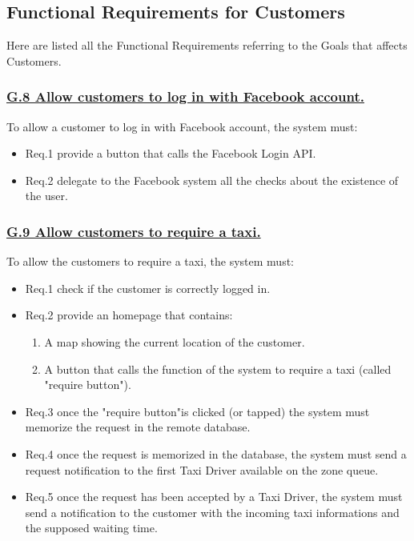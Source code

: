 \documentclass{report}
\begin{document}
		\subsection{Functional Requirements for Customers}
		Here are listed all the Functional Requirements referring to the Goals that affects Customers.

			\subsubsection{\lbrack \hyperref[sec:g8]{G.8 Allow customers to log in with Facebook account.}\rbrack}\label{sec:frs8}
			To allow a customer to log in with Facebook account, the system must:

				\begin{itemize}
					\item \lbrack Req.1\rbrack \label{sec:fr1_g8} provide a button that calls the Facebook Login API.
					\item \lbrack Req.2\rbrack \label{sec:fr2_g8} delegate to the Facebook system all the checks about the existence of the user.
				\end{itemize}

			\subsubsection{\lbrack \hyperref[sec:g9]{G.9 Allow customers to require a taxi.}\rbrack}\label{sec:frs9}
			To allow the customers to require a taxi, the system must:

				\begin{itemize}
					\item \lbrack Req.1\rbrack \label{sec:fr1_g9} check if the customer is correctly logged in.
					\item \lbrack Req.2\rbrack \label{sec:fr2_g9} provide an homepage that contains:
						\begin{enumerate}
							\item A map showing the current location of the customer.
							\item A button that calls the function of the system to require a taxi (called "require button").
						\end{enumerate}
					\item \lbrack Req.3\rbrack \label{sec:fr3_g9} once the "require button"is clicked (or tapped) the system must memorize the request in the remote database.
					\item \lbrack Req.4\rbrack \label{sec:fr4_g9} once the request is memorized in the database, the system must send a request notification to the first Taxi Driver available on the zone queue.
					\item \lbrack Req.5\rbrack \label{sec:fr5_g9} once the request has been accepted by a Taxi Driver, the system must send a notification to the customer with the incoming taxi informations and the supposed waiting time.
				\end{itemize}
\end{document}

